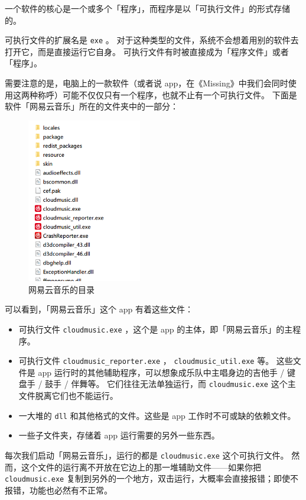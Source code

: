 一个软件的核心是一个或多个「程序」，而程序是以「可执行文件」的形式存储的。

可执行文件的扩展名是 \verb|exe| 。
对于这种类型的文件，系统不会想着用别的软件去打开它，而是直接运行它自身。
可执行文件有时被直接成为「程序文件」或者「程序」。

需要注意的是，电脑上的一款软件（或者说 app，在《Missing》中我们会同时使用这两种称呼）可能不仅仅只有一个程序，也就不止有一个可执行文件。
下面是软件「网易云音乐」所在的文件夹中的一部分：

\begin{figure}[htb!]
  \centering
  \includegraphics[width=5cm]{assets/NetEase_Music.png}
  \caption{网易云音乐的目录}
  \label{NetEase_Music}
\end{figure}

可以看到，「网易云音乐」这个 app 有着这些文件：

\begin{itemize}
  \item 可执行文件 \verb|cloudmusic.exe| ，这个是 app 的主体，即「网易云音乐」的主程序。
  \item 可执行文件 \verb|cloudmusic_reporter.exe| ， \verb|cloudmusic_util.exe| 等。
    这些文件是 app 运行时的其他辅助程序，可以想象成乐队中主唱身边的吉他手 / 键盘手 / 鼓手 / 伴舞等。
    它们往往无法单独运行，而 \verb|cloudmusic.exe| 这个主文件脱离它们也不能运行。
  \item 一大堆的 \verb|dll| 和其他格式的文件。这些是 app 工作时不可或缺的依赖文件。
  \item 一些子文件夹，存储着 app 运行需要的另外一些东西。
\end{itemize}

每次我们启动「网易云音乐」，运行的都是 \verb|cloudmusic.exe| 这个可执行文件。
然而，这个文件的运行离不开放在它边上的那一堆辅助文件——如果你把 \verb|cloudmusic.exe| 复制到另外的一个地方，双击运行，大概率会直接报错；即使不报错，功能也必然有不正常。

